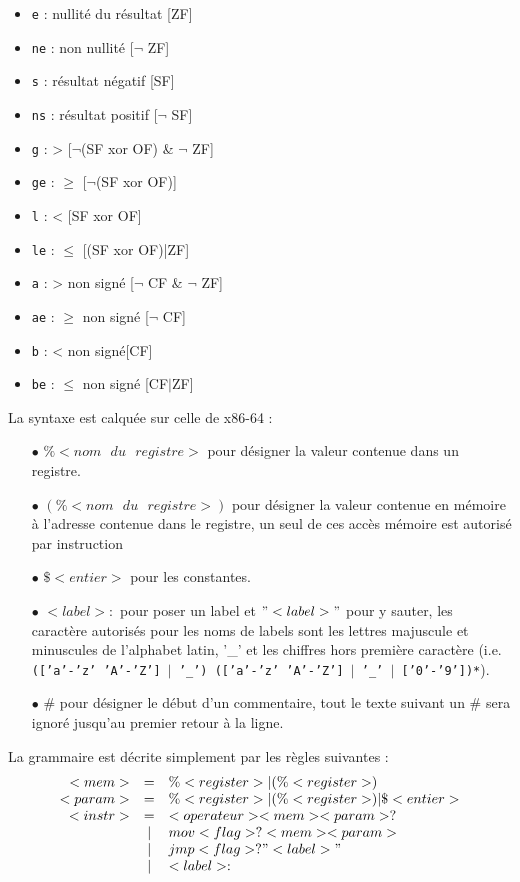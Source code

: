 \documentclass[10pt,a4paper,notitlepage ]{article}
\begin{document}
{\begin{itemize}
		\item \texttt{e} : nullité du résultat [ZF]
		\item \texttt{ne} : non nullité [$\neg$ ZF]
		\item \texttt{s} : résultat négatif [SF]
		\item \texttt{ns} : résultat positif [$\neg$ SF]
		\item \texttt{g} : > [$\neg$(SF xor OF) \& $\neg$ ZF] 
		\item \texttt{ge} : $\geqslant$ [$\neg$(SF xor OF)]
		\item \texttt{l} : < [SF xor OF]
		\item \texttt{le} : $\leqslant$ [(SF xor OF)|ZF]
		\item \texttt{a} : > non signé [$\neg$ CF \& $\neg$ ZF]
		\item \texttt{ae} : $\geqslant$ non signé [$\neg$ CF]
		\item \texttt{b} : < non signé[CF]
		\item \texttt{be} : $\leqslant$ non signé [CF$\vert$ZF]
	\end{itemize}}
	\par{La syntaxe  est calquée sur celle de x86-64 :
	\begin{itemize}
		\item[$\bullet$] $\%<nom \text{ } du \text{ } registre>$ pour désigner la valeur contenue dans un registre.
		\item[$\bullet$] $(\%<nom \text{ } du \text{ } registre>)$ pour désigner la valeur contenue en mémoire à l'adresse contenue dans le registre, un seul de ces accès mémoire est autorisé par instruction
		\item[$\bullet$] $\$<entier>$ pour les constantes.
		\item[$\bullet$] $<label>:$ pour poser un label et $"<label>"$ pour y sauter, les caractère autorisés pour les noms de labels sont les lettres majuscule et minuscules de l'alphabet latin, '\_' et les chiffres hors première caractère (i.e. \texttt{(['a'-'z' 'A'-'Z'] $\vert$ '\_') (['a'-'z' 'A'-'Z'] $\vert$ '\_' $\vert$ ['0'-'9'])*}).
		\item[$\bullet$] $\#$ pour désigner le début d'un commentaire, tout le texte suivant un $\#$ sera ignoré jusqu'au premier retour à la ligne.
	\end{itemize}
	La grammaire est décrite simplement par les règles suivantes :
	$$\begin{array}{rcl}
		<mem> & = & \%<register> | (\%<register>) \\
		<param> & = &  \%<register> | (\%<register>) | \$<entier>\\
		<instr> & = & <operateur> <mem> <param>? \\
		& | & mov <flag>? <mem> <param> \\
		& | & jmp <flag>? "<label>" \\
		& | & <label> : \\ 
	\end{array}$$}
		
\end{document}
